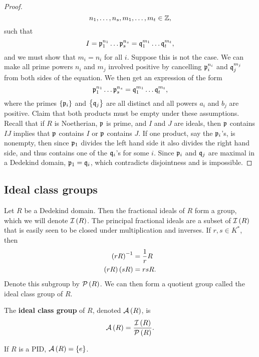 \begin{proof}
$$ n_1, \dots, n_s, m_1, \dots, m_t \in \mathbb{Z}, $$
such that
$$ I = \mathfrak{p}_1^{n_1} \dots \mathfrak{p}_s^{n_s} = \mathfrak{q}_1^{m_1} \dots \mathfrak{q}_t^{m_t}, $$
and we must show that $ m_i = n_i $ for all $ i $. Suppose this is not the case. We can make all prime powers $ n_i $ and $ m_j $ involved positive by cancelling $ \mathfrak{p}_i^{n_i} $ and $ \mathfrak{q}_j^{m_j} $ from both sides of the equation. We then get an expression of the form
$$ \mathfrak{p}_1^{n_1} \dots \mathfrak{p}_s^{n_s} = \mathfrak{q}_1^{m_1} \dots \mathfrak{q}_t^{m_t}, $$
where the primes $ \cbr{\pp_i} $ and $ \cbr{\qq_j} $ are all distinct and all powers $ a_i $ and $ b_j $ are positive. Claim that both products must be empty under these assumptions. Recall that if $ R $ is Noetherian, $ \mathfrak{p} $ is prime, and $ I $ and $ J $ are ideals, then $ \mathfrak{p} $ contains $ IJ $ implies that $ \mathfrak{p} $ contains $ I $ or $ \mathfrak{p} $ contains $ J $. If one product, say the $ \mathfrak{p}_i $'s, is nonempty, then since $ \mathfrak{p}_1 $ divides the left hand side it also divides the right hand side, and thus contains one of the $ \mathfrak{q}_i $'s for some $ i $. Since $ \mathfrak{p}_i $ and $ \mathfrak{q}_j $ are maximal in a Dedekind domain, $ \mathfrak{p}_1 = \mathfrak{q}_i $, which contradicts disjointness and is impossible.
\end{proof}

\pagebreak

\subsection{Ideal class groups}

Let $ R $ be a Dedekind domain. Then the fractional ideals of $ R $ form a group, which we will denote $ \II\br{R} $. The principal fractional ideals are a subset of $ \II\br{R} $ that is easily seen to be closed under multiplication and inverses. If $ r, s \in K^* $, then
\begin{align*}
\br{rR}^{-1} & = \dfrac{1}{r}R \\
\br{rR}\br{sR} & = rsR.
\end{align*}
Denote this subgroup by $ \PP\br{R} $. We can then form a quotient group called the ideal class group of $ R $.

\begin{definition}
The \textbf{ideal class group} of $ R $, denoted $ \AA\br{R} $, is
$$ \AA\br{R} = \dfrac{\II\br{R}}{\PP\br{R}}. $$
\end{definition}

\begin{example*}
If $ R $ is a PID, $ \AA\br{R} = \cbr{e} $.
\end{example*}

